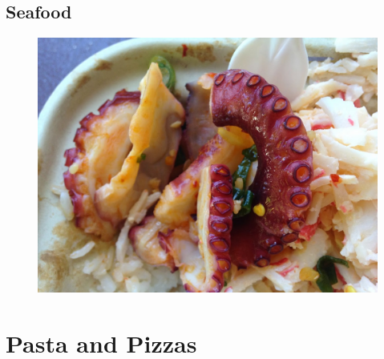 \documentclass[11pt]{report}
\begin{document}
\chapter{Seafood}
\begin{figure}[h]
\begin{center}
   \includegraphics[width=\linewidth]{images/IMG_0456.JPG}
\end{center}
\end{figure}
\newpage







\part{Pasta and Pizzas}
\end{document}
